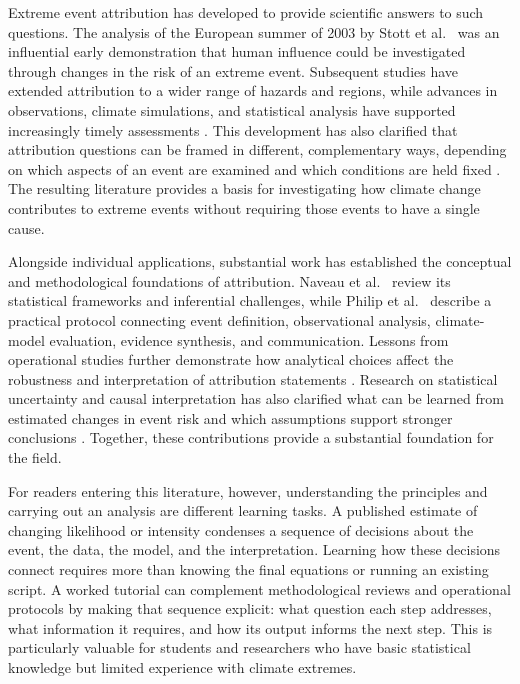 \documentclass[11pt]{article}
\begin{document}
Extreme event attribution has developed to provide scientific answers
to such questions. The analysis of the European summer of 2003 by
Stott et al.\ \cite{stott2004human} was an influential early
demonstration
that human influence could be investigated through changes in the risk
of an extreme event. Subsequent studies have extended attribution to a
wider range of hazards and regions, while advances in observations,
climate simulations, and statistical analysis have supported
increasingly timely assessments
\cite{stott2016attribution,otto2017attribution}. This
development has also clarified that attribution questions can be
framed in different, complementary ways, depending on which aspects of
an event are examined and which conditions are held fixed
\cite{shepherd2016common}. The resulting literature provides a basis
for
investigating how climate change contributes to extreme events without
requiring those events to have a single cause.

Alongside individual applications, substantial work has established
the conceptual and methodological foundations of attribution. Naveau
et al.\ \cite{naveau2020statistical} review its statistical frameworks
and
inferential challenges, while Philip et al.\ \cite{philip2020protocol}
describe a practical protocol connecting event definition,
observational analysis, climate-model evaluation, evidence synthesis,
and communication. Lessons from operational studies further
demonstrate how analytical choices affect the robustness and
interpretation of attribution statements \cite{van2021pathways}.
Research on
statistical uncertainty and causal interpretation has also clarified
what can be learned from estimated changes in event risk and which
assumptions support stronger conclusions
\cite{hannart2016causal,paciorek2018quantifying}. Together, these
contributions
provide a substantial foundation for the field.

For readers entering this literature, however, understanding the
principles and carrying out an analysis are different learning tasks.
A published estimate of changing likelihood or intensity condenses a
sequence of decisions about the event, the data, the model, and the
interpretation. Learning how these decisions connect requires more
than knowing the final equations or running an existing script. A
worked tutorial can complement methodological reviews and operational
protocols by making that sequence explicit: what question each step
addresses, what information it requires, and how its output informs
the next step. This is particularly valuable for students and
researchers who have basic statistical knowledge but limited
experience with climate extremes.
\end{document}
